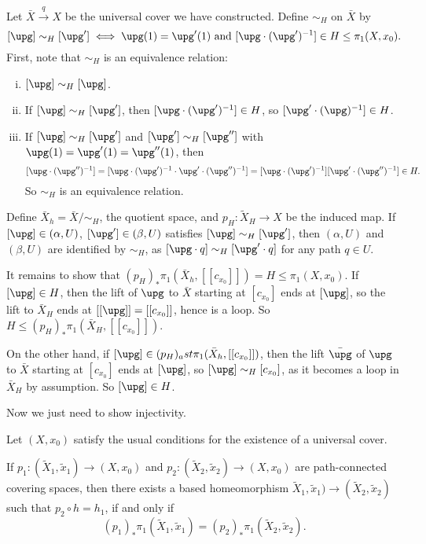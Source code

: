 \documentclass[12pt]{article}
\begin{document}
\begin{proofbox}
	Let $\bar X \overset{q}{\to} X$ be the universal cover we have constructed. Define $\sim_H$ on $\bar X$ by
	\[
		[\upg] \sim_H [\upg'] \iff \upg(1) = \upg'(1) \text{ and } [\upg \cdot (\upg')^{-1}] \in H \leq \pi_1(X, x_0).
	\]
	First, note that $\sim_H$ is an equivalence relation:
	\begin{enumerate}[(i)]
		\item $[\upg] \sim_H [\upg]$.
		\item If $[\upg] \sim_H [\upg']$, then $[\upg \cdot (\upg')^{-1}] \in H$, so $[\upg' \cdot (\upg)^{-1}] \in H$.
		\item If $[\upg] \sim_H [\upg']$ and $[\upg'] \sim_H [\upg'']$ with $\upg(1) = \upg'(1) = \upg''(1)$, then
			\[
				[\upg \cdot (\upg'')^{-1}] = [\upg \cdot (\upg')^{-1} \cdot \upg' \cdot (\upg'')^{-1}] = [\upg \cdot (\upg')^{-1}] [\upg' \cdot (\upg'')^{-1}] \in H.
			\]
			So $\sim_H$ is an equivalence relation. 
	\end{enumerate}
	Define $\bar X_h = \bar X/ \sim_H$, the quotient space, and $p_H : \tilde X_H \to X$ be the induced map. If $[\upg] \in (\alpha, U)$, $[\upg'] \in (\beta, U)$ satisfies $[\upg] \sim_H [\upg']$, then $(\alpha, U)$ and $(\beta, U)$ are identified by $\sim_H$, as $[\upg \cdot q] \sim_H [\upg' \cdot q]$ for any path $q \in U$.

	It remains to show that $(p_H)_\ast \pi_1(\bar X_h, [[c_{x_0}]]) = H \leq \pi_1(X, x_0)$. If $[\upg] \in H$, then the lift of $\upg$ to $\bar X$ starting at $[c_{x_0}]$ ends at $[\upg]$, so the lift to $\bar X_H$ ends at $[[\upg]] = [[c_{x_0}]]$, hence is a loop. So $H \leq (p_H)_\ast \pi_1(\bar X_H, [[c_{x_0}]])$.

	On the other hand, if $[\upg] \in (p_H)_ast \pi_1(\bar X_h, [[c_{x_0}]])$, then the lift $\bar \upg$ of $\upg$ to $\bar X$ starting at $[c_{x_0}]$ ends at $[\upg]$, so $[\upg] \sim_H [c_{x_0}]$, as it becomes a loop in $\bar X_H$ by assumption. So $[\upg] \in H$.
\end{proofbox}


Now we just need to show injectivity.

\begin{proposition}
	Let $(X, x_0)$ satisfy the usual conditions for the existence of a universal cover.

	If $p_1 : (\tilde X_1, \tilde x_1) \to (X, x_0)$ and $p_2 : (\tilde X_2, \tilde x_2) \to (X, x_0)$ are path-connected covering spaces, then there exists a based homeomorphism $\tilde X_1, \tilde x_1) \to (\tilde X_2, \tilde x_2)$ such that $p_2 \circ h = h_1$, if and only if \[
	(p_1)_\ast \pi_1(\tilde X_1, \tilde x_1) = (p_2)_\ast \pi_1(\tilde X_2, \tilde x_2).
\]
\end{proposition}
\end{document}
